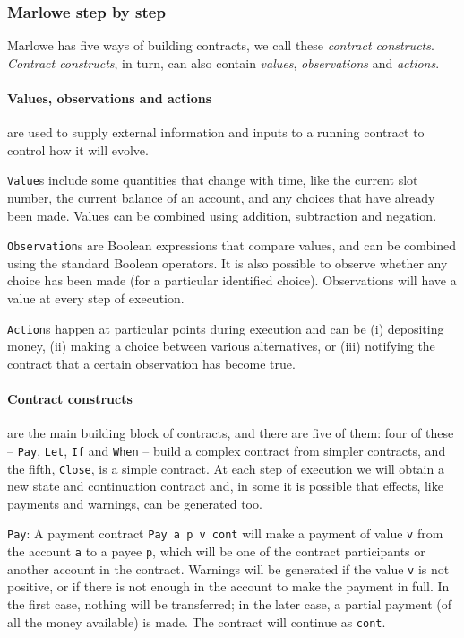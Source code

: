 \documentclass[runningheads]{llncs}
\begin{document}
\subsubsection*{Marlowe step by step}

Marlowe has five ways of building contracts, we call these \emph{contract constructs}. \emph{Contract constructs}, in turn, can also contain \emph{values}, \emph{observations} and \emph{actions}.

\paragraph{Values, observations and actions} are used to supply external information and inputs to a running contract to control how it will evolve.

\texttt{Value}s include some quantities that change with time, like the current slot number, the current balance of an account, and any choices that have already been made. %
Values can be combined using addition, subtraction and negation.

\texttt{Observation}s are Boolean expressions that compare values, and can be combined using the standard Boolean operators. It is also possible to observe whether any choice has been made (for a particular identified choice). Observations will have a value at every step of execution.

\texttt{Action}s happen at particular points during execution and can be (i) depositing money, (ii) making a choice between various alternatives, or (iii) notifying the contract that a certain observation has become true.

\paragraph{Contract constructs} are the main building block of contracts, and there are five of them: four of these -- \texttt{Pay}, \texttt{Let}, \texttt{If} and \texttt{When} -- build a complex contract from simpler contracts, and the fifth, \texttt{Close}, is a simple contract. At each step of execution we will obtain a new state and continuation contract and, in some it is possible that effects, like payments and warnings, can be generated too.

\texttt{Pay}: A payment contract \texttt{Pay a p v cont} will make a payment of value \texttt{v} from the account \texttt{a} to a payee \texttt{p}, which will be one of the contract participants or another account in the contract. Warnings will be generated if the value \texttt{v} is not positive, or if there is not enough in the account to make the payment in full. In the first case, nothing will be transferred; in the later case, a partial payment (of all the money available) is made. The contract will continue as \texttt{cont}.
\end{document}
